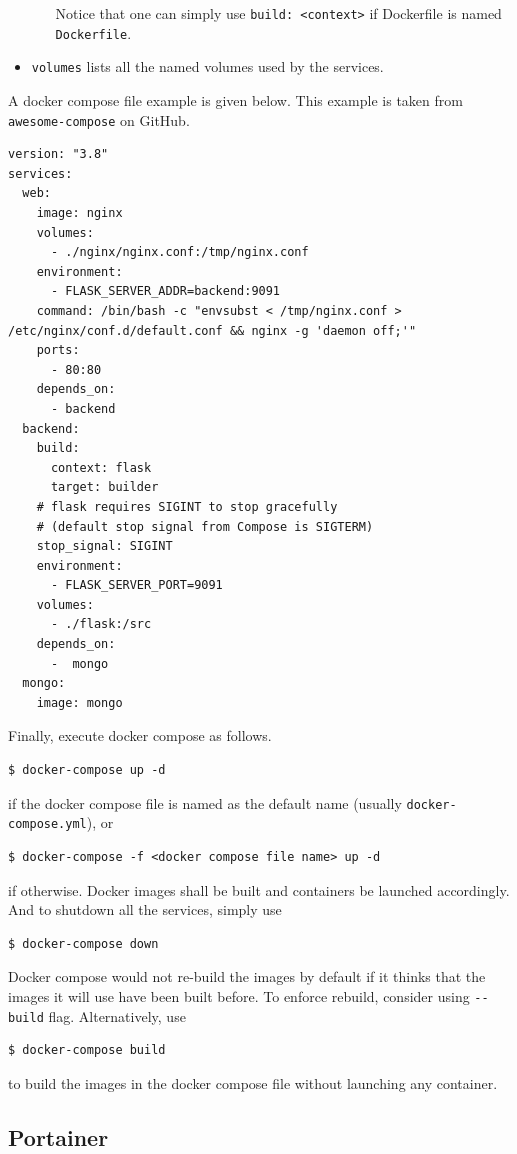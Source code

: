\begin{itemize}
\begin{itemize}
		Notice that one can simply use \texttt{build: <context>} if Dockerfile is named \verb|Dockerfile|.
		
	\end{itemize}
	
	\item \verb|volumes| lists all the named volumes used by the services.
\end{itemize}

A docker compose file example is given below. This example is taken from \texttt{awesome-compose} on GitHub. 
\begin{lstlisting}
version: "3.8"
services:
  web:
    image: nginx
    volumes:
      - ./nginx/nginx.conf:/tmp/nginx.conf
    environment: 
      - FLASK_SERVER_ADDR=backend:9091  
    command: /bin/bash -c "envsubst < /tmp/nginx.conf > /etc/nginx/conf.d/default.conf && nginx -g 'daemon off;'" 
    ports:
      - 80:80
    depends_on:
      - backend
  backend:
    build:
      context: flask
      target: builder
    # flask requires SIGINT to stop gracefully
    # (default stop signal from Compose is SIGTERM)
    stop_signal: SIGINT
    environment:
      - FLASK_SERVER_PORT=9091
    volumes:
      - ./flask:/src
    depends_on:
      -  mongo  
  mongo:
    image: mongo
\end{lstlisting}

Finally, execute docker compose as follows.
\begin{lstlisting}
$ docker-compose up -d
\end{lstlisting}
if the docker compose file is named as the default name (usually \verb|docker-compose.yml|), or
\begin{lstlisting}
$ docker-compose -f <docker compose file name> up -d
\end{lstlisting}
if otherwise. Docker images shall be built and containers be launched accordingly. And to shutdown all the services, simply use
\begin{lstlisting}
$ docker-compose down
\end{lstlisting}

Docker compose would not re-build the images by default if it thinks that the images it will use have been built before. To enforce rebuild, consider using \verb|--build| flag. Alternatively, use 
\begin{lstlisting}
$ docker-compose build
\end{lstlisting}
to build the images in the docker compose file without launching any container.

\subsection{Portainer}

